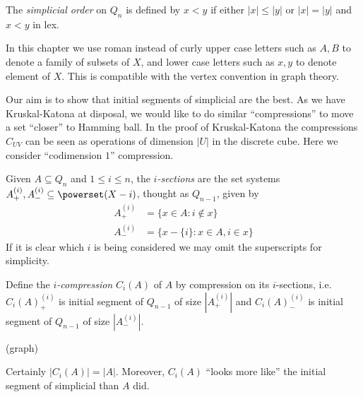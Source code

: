 \documentclass[a4paper]{article}
\begin{document}
\begin{definition}
  The \emph{simplicial order} on \(Q_n\) is defined by \(x < y\) if either \(|x| \leq |y|\) or \(|x| = |y|\) and \(x < y\) in lex.
\end{definition}

\begin{notation}
  In this chapter we use roman instead of curly upper case letters such as \(A, B\) to denote a family of subsets of \(X\), and lower case letters such as \(x, y\) to denote element of \(X\). This is compatible with the vertex convention in graph theory.
\end{notation}

Our aim is to show that initial segments of simplicial are the best. As we have Kruskal-Katona at disposal, we would like to do similar ``compressions'' to move a set ``closer'' to Hamming ball. In the proof of Kruskal-Katona the compressions \(C_{UV}\) can be seen as operations of dimension \(|U|\) in the discrete cube. Here we consider ``codimension \(1\)'' compression.

\begin{definition}[section]
  Given \(A \subseteq Q_n\) and \(1 \leq i \leq n\), the \emph{\(i\)-sections} are the set systems \(A^{(i)}_+, A^{(i)}_- \subseteq \powerset(X - i)\), thought as \(Q_{n - 1}\), given by
  \begin{align*}
    A^{(i)}_+ &= \{x \in A: i \notin x\} \\
    A^{(i)}_- &= \{x - \{i\}: x \in A, i \in x\}
  \end{align*}
  If it is clear which \(i\) is being considered we may omit the superscripts for simplicity.
\end{definition}

\begin{definition}[\(i\)-compression]
  Define the \emph{\(i\)-compression} \(C_i(A)\) of \(A\) by compression on its \(i\)-sections, i.e.\ \(C_i(A)^{(i)}_+\) is initial segment of \(Q_{n - 1}\) of size \(|A^{(i)}_+|\) and \(C_i(A)^{(i)}_-\) is initial segment of \(Q_{n - 1}\) of size \(|A^{(i)}_-|\).
\end{definition}

\begin{eg}
  (graph)
\end{eg}

Certainly \(|C_i(A)| = |A|\). Moreover, \(C_i(A)\) ``looks more like'' the initial segment of simplicial than \(A\) did.
\end{document}
